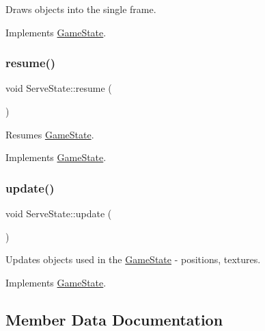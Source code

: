 Draws objects into the single frame. 



Implements \mbox{\hyperlink{class_game_state_a0d56cd5355f59a87cf95e1c6d719f329}{Game\+State}}.

\mbox{\label{class_serve_state_ae9a501a1f103b02685fdd4caac5685e5}} 
\subsubsection{\texorpdfstring{resume()}{resume()}}
{\footnotesize\ttfamily void Serve\+State\+::resume (\begin{DoxyParamCaption}{ }\end{DoxyParamCaption})\hspace{0.3cm}{\ttfamily [virtual]}}



Resumes \mbox{\hyperlink{class_game_state}{Game\+State}}. 



Implements \mbox{\hyperlink{class_game_state_a4a421c44f4dae6e9a4fbe10b6e8c47ac}{Game\+State}}.

\mbox{\label{class_serve_state_ac227c95e6d1ed3f3d1fc01c4035db847}} 
\subsubsection{\texorpdfstring{update()}{update()}}
{\footnotesize\ttfamily void Serve\+State\+::update (\begin{DoxyParamCaption}\item[{\mbox{\hyperlink{class_game_engine}{Game\+Engine}} $\ast$}]{ }\end{DoxyParamCaption})\hspace{0.3cm}{\ttfamily [virtual]}}



Updates objects used in the \mbox{\hyperlink{class_game_state}{Game\+State}} -\/ positions, textures. 



Implements \mbox{\hyperlink{class_game_state_a66b11afe355a9479f94aaf76576980bd}{Game\+State}}.



\subsection{Member Data Documentation}
\mbox{\label{class_serve_state_ae82617584b22ac05ab6991e3a8fe3c55}} 
